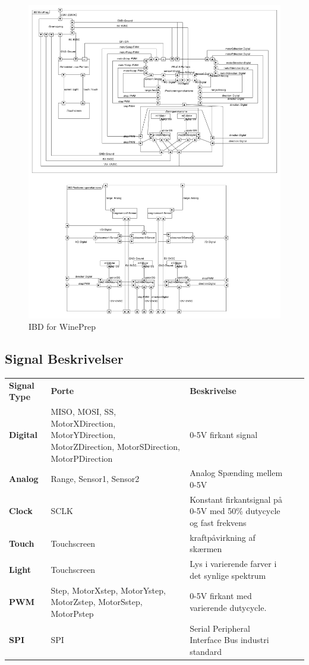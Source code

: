 \begin{figure}[H]
	\centering
	\includegraphics[scale=0.25]{IBDopdateret}
	\caption{IBD for WinePrep}
	\label{IBD}
\end{figure}

\subsection{Signal Beskrivelser}

\begin{tabularx}{360pt}{>{\bfseries}p{50pt}  TX TX}
	Signal Type & \textbf{Porte} & \textbf{Beskrivelse} \\
	Digital & MISO, MOSI, SS, MotorXDirection, MotorYDirection, MotorZDirection, MotorSDirection, MotorPDirection & 0-5V firkant signal \\
	Analog & Range, Sensor1, Sensor2 & Analog Spænding mellem 0-5V \\
	Clock & SCLK & Konstant firkantsignal på 0-5V med 50\% dutycycle og fast frekvens \\
	Touch & Touchscreen & kraftpåvirkning af skærmen \\
	Light & Touchscreen & Lys i varierende farver i det synlige spektrum \\
	PWM & Step, MotorXstep, MotorYstep, MotorZstep, MotorSstep, MotorPstep & 0-5V firkant med varierende dutycycle. \\
	SPI & SPI & Serial Peripheral Interface Bus industri standard \\
\end{tabularx}